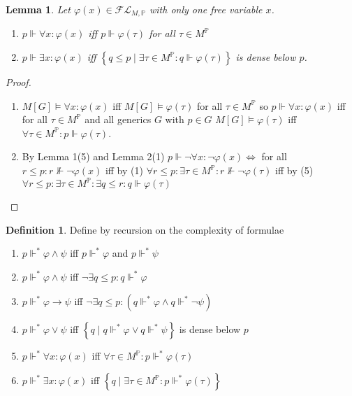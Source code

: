 \documentclass{scrartcl}
\newcommand{\set}[1]{\left\{#1\right\}}
\theoremstyle{definition}
\newtheorem*{definition*}{Definition}
\theoremstyle{plain}
\newtheorem*{lemma*}{Lemma}
\theoremstyle{remark}
\begin{document}
	\begin{lemma*}
		Let $\varphi(x) \in \mathcal{FL}_{M, \mathbb{P}}$ with only one free
		variable $x$.

		 \begin{enumerate}[1.]
		 	\item $p \Vdash \forall x: \varphi(x)$ iff $p \Vdash \varphi(\tau)$ for all
			$\tau \in M^\mathbb{P}$
			\item $p \Vdash \exists x: \varphi(x)$ iff $\set{q \leq p \mid
			\exists \tau \in M^\mathbb{P}: q \Vdash \varphi(\tau)}$ is dense
			below $p$.
		 \end{enumerate}
	\end{lemma*}

	\begin{proof}
		\begin{enumerate}[1.]
			\item $M[G] \vDash \forall x: \varphi(x)$ iff $M[G] \vDash \varphi(\tau)$
			for all $\tau \in M^\mathbb{P}$ so $p \Vdash \forall x: \varphi(x)$ iff
			for all $\tau \in M^\mathbb{P}$ and all generics $G$ with $p \in G$
			$M[G] \vDash \varphi(\tau)$ iff $\forall \tau \in M^\mathbb{P}: p \Vdash
			\varphi(\tau)$.

			\item By Lemma 1(5) and Lemma 2(1) $p\Vdash \lnot \forall x:\lnot \varphi(x)
			\iff $ for all $r \leq p: r \nVdash \lnot \varphi(x) $ iff by (1) $
			\forall r\leq p: \exists \tau \in M^\mathbb{P}: r\nVdash \lnot \varphi(\tau)
			$ iff by (5) $\forall r \leq p: \exists \tau \in M^\mathbb{P}: \exists q \leq r: q \Vdash \varphi(\tau)$
		\end{enumerate}
	\end{proof}

	\begin{definition*}
		Define by recursion on the complexity of formulae
		\begin{enumerate}[1.]
			\item $p \Vdash^* \varphi \land \psi$ iff $p \Vdash^* \varphi$ and $p \Vdash^* \psi$
			\item $p \Vdash^* \varphi \land \psi$ iff $\lnot \exists q \leq p: q \Vdash^* \varphi$
			\item $p \Vdash^* \varphi \longrightarrow \psi$ iff $\lnot \exists q \leq p: (q \Vdash^* \varphi \land q \Vdash^* \lnot \psi)$
			\item $p \Vdash^* \varphi \lor \psi$ iff $\set{q \mid q \Vdash^* \varphi \lor q \Vdash^* \psi}$ is dense below $p$
			\item $p \Vdash^* \forall x: \varphi(x)$ iff $\forall \tau \in M^\mathbb{P}: p \Vdash^* \varphi(\tau)$
			\item $p \Vdash^* \exists x: \varphi(x)$ iff $\set{q \mid \exists \tau \in M^\mathbb{P}: p \Vdash^* \varphi(\tau)}$
		\end{enumerate}
	\end{definition*}
\end{document}
